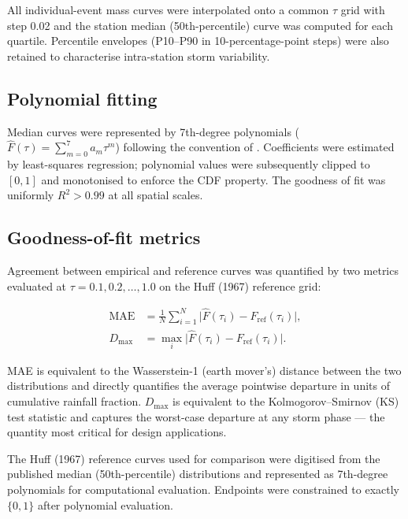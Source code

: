 \documentclass[a4paper,fleqn]{cas-sc}
\begin{document}
All individual-event mass curves were interpolated onto a common
$\tau$ grid with step 0.02 and the station median (50th-percentile)
curve was computed for each quartile. Percentile envelopes
(P10–P90 in 10-percentage-point steps) were also retained to
characterise intra-station storm variability.

\subsection{Polynomial fitting}
\label{sec:poly}

Median curves were represented by 7th-degree polynomials
($\hat{F}(\tau) = \sum_{m=0}^{7} a_m \tau^m$) following the
convention of \citet{Huff1967}. Coefficients were estimated by
least-squares regression; polynomial values were subsequently
clipped to $[0, 1]$ and monotonised to enforce the CDF property.
The goodness of fit was uniformly $R^2 > 0.99$ at all spatial
scales.

\subsection{Goodness-of-fit metrics}
\label{sec:metrics}

Agreement between empirical and reference curves was quantified by
two metrics evaluated at $\tau = 0.1, 0.2, \ldots, 1.0$ on the
Huff (1967) reference grid:

\begin{align}
  \mathrm{MAE} &= \frac{1}{N} \sum_{i=1}^{N}
                  \bigl| \hat{F}(\tau_i) - F_\mathrm{ref}(\tau_i) \bigr|,
                  \label{eq:mae} \\
  D_\mathrm{max} &= \max_{i} \bigl| \hat{F}(\tau_i)
                   - F_\mathrm{ref}(\tau_i) \bigr|.
                   \label{eq:dmax}
\end{align}

MAE is equivalent to the Wasserstein-1 (earth mover's) distance
between the two distributions \citep{Villani2003} and directly
quantifies the average pointwise departure in units of cumulative
rainfall fraction. $D_\mathrm{max}$ is equivalent to the
Kolmogorov–Smirnov (KS) test statistic \citep{Massey1951} and
captures the worst-case departure at any storm phase — the quantity
most critical for design applications.

The Huff (1967) reference curves used for comparison were digitised
from the published median (50th-percentile) distributions and
represented as 7th-degree polynomials for computational evaluation.
Endpoints were constrained to exactly $\{0, 1\}$ after polynomial
evaluation.
\end{document}
